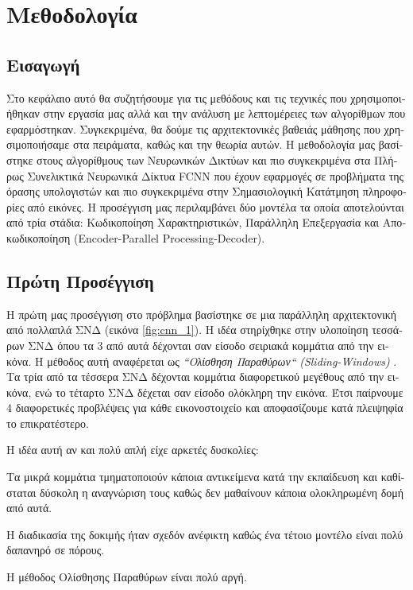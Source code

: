 \chapter{\textgreek{Μεθοδολογία}}
\label{chapter_2}

\pagestyle{fancy}
\fancyhf{}
\renewcommand{\footrulewidth}{0.5pt}
\cfoot{\thepage}

\section{\textgreek{Εισαγωγή}}
\textgreek{Στο κεφάλαιο αυτό θα συζητήσουμε για τις μεθόδους και τις τεχνικές που χρησιμοποιήθηκαν στην εργασία μας αλλά και την ανάλυση με λεπτομέρειες των αλγορίθμων που εφαρμόστηκαν. Συγκεκριμένα, θα δούμε τις αρχιτεκτονικές βαθειάς μάθησης που χρησιμοποιήσαμε στα πειράματα, καθώς και την θεωρία αυτών. Η μεθοδολογία μας βασίστηκε στους αλγορίθμους των Νευρωνικών Δικτύων και πιο συγκεκριμένα στα Πλήρως Συνελικτικά Νευρωνικά Δίκτυα} FCNN \textgreek{που έχουν εφαρμογές σε προβλήματα της όρασης υπολογιστών και πιο συγκεκριμένα στην Σημασιολογική Κατάτμηση πληροφορίες από εικόνες. Η προσέγγιση μας περιλαμβάνει δύο μοντέλα τα οποία αποτελούνται από τρία στάδια: Κωδικοποίηση Χαρακτηριστικών, Παράλληλη Επεξεργασία και Αποκωδικοποίηση} (Encoder-Parallel Processing-Decoder). 

\section{\textgreek{Πρώτη Προσέγγιση}} 
\textgreek{Η πρώτη μας προσέγγιση στο πρόβλημα βασίστηκε σε μια παράλληλη αρχιτεκτονική από πολλαπλά ΣΝΔ (εικόνα} \ref{fig:cnn_1}). \textgreek{Η ιδέα στηρίχθηκε στην υλοποίηση τεσσάρων ΣΝΔ όπου τα 3 από αυτά δέχονται σαν είσοδο σειριακά κομμάτια από την εικόνα. Η μέθοδος αυτή αναφέρεται ως \emph{``Ολίσθηση Παραθύρων``}} \emph{(Sliding-Windows)} \cite{sliding_window}. \textgreek{Τα τρία από τα τέσσερα ΣΝΔ δέχονται κομμάτια διαφορετικού μεγέθους από την εικόνα, ενώ το τέταρτο ΣΝΔ δέχεται σαν είσοδο ολόκληρη την εικόνα. Έτσι παίρνουμε 4 διαφορετικές προβλέψεις για κάθε εικονοστοιχείο και αποφασίζουμε κατά πλειψηφία το επικρατέστερο.}\par

\textgreek{Η ιδέα αυτή αν και πολύ απλή είχε αρκετές δυσκολίες}:

\begin{description}[labelindent=10pt, style=multiline, leftmargin=30pt]
 \item[1.] \textgreek{Τα μικρά κομμάτια τμηματοποιούν κάποια αντικείμενα κατά την εκπαίδευση και καθίσταται δύσκολη η αναγνώριση τους καθώς δεν μαθαίνουν κάποια ολοκληρωμένη δομή από αυτά.}
 \item[2.] \textgreek{Η διαδικασία της δοκιμής ήταν σχεδόν ανέφικτη καθώς ένα τέτοιο μοντέλο είναι πολύ δαπανηρό σε πόρους.}
 \item[3.] \textgreek{Η μέθοδος Ολίσθησης Παραθύρων είναι πολύ αργή.}
\end{description}

